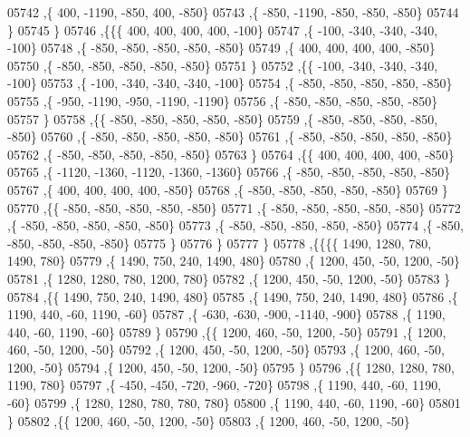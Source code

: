 \begin{DoxyCode}
05742     ,\{   400, -1190,  -850,   400,  -850\}
05743     ,\{  -850, -1190,  -850,  -850,  -850\}
05744     \}
05745    \}
05746   ,\{\{\{   400,   400,   400,   400,  -100\}
05747     ,\{  -100,  -340,  -340,  -340,  -100\}
05748     ,\{  -850,  -850,  -850,  -850,  -850\}
05749     ,\{   400,   400,   400,   400,  -850\}
05750     ,\{  -850,  -850,  -850,  -850,  -850\}
05751     \}
05752    ,\{\{  -100,  -340,  -340,  -340,  -100\}
05753     ,\{  -100,  -340,  -340,  -340,  -100\}
05754     ,\{  -850,  -850,  -850,  -850,  -850\}
05755     ,\{  -950, -1190,  -950, -1190, -1190\}
05756     ,\{  -850,  -850,  -850,  -850,  -850\}
05757     \}
05758    ,\{\{  -850,  -850,  -850,  -850,  -850\}
05759     ,\{  -850,  -850,  -850,  -850,  -850\}
05760     ,\{  -850,  -850,  -850,  -850,  -850\}
05761     ,\{  -850,  -850,  -850,  -850,  -850\}
05762     ,\{  -850,  -850,  -850,  -850,  -850\}
05763     \}
05764    ,\{\{   400,   400,   400,   400,  -850\}
05765     ,\{ -1120, -1360, -1120, -1360, -1360\}
05766     ,\{  -850,  -850,  -850,  -850,  -850\}
05767     ,\{   400,   400,   400,   400,  -850\}
05768     ,\{  -850,  -850,  -850,  -850,  -850\}
05769     \}
05770    ,\{\{  -850,  -850,  -850,  -850,  -850\}
05771     ,\{  -850,  -850,  -850,  -850,  -850\}
05772     ,\{  -850,  -850,  -850,  -850,  -850\}
05773     ,\{  -850,  -850,  -850,  -850,  -850\}
05774     ,\{  -850,  -850,  -850,  -850,  -850\}
05775     \}
05776    \}
05777   \}
05778  ,\{\{\{\{  1490,  1280,   780,  1490,   780\}
05779     ,\{  1490,   750,   240,  1490,   480\}
05780     ,\{  1200,   450,   -50,  1200,   -50\}
05781     ,\{  1280,  1280,   780,  1200,   780\}
05782     ,\{  1200,   450,   -50,  1200,   -50\}
05783     \}
05784    ,\{\{  1490,   750,   240,  1490,   480\}
05785     ,\{  1490,   750,   240,  1490,   480\}
05786     ,\{  1190,   440,   -60,  1190,   -60\}
05787     ,\{  -630,  -630,  -900, -1140,  -900\}
05788     ,\{  1190,   440,   -60,  1190,   -60\}
05789     \}
05790    ,\{\{  1200,   460,   -50,  1200,   -50\}
05791     ,\{  1200,   460,   -50,  1200,   -50\}
05792     ,\{  1200,   450,   -50,  1200,   -50\}
05793     ,\{  1200,   460,   -50,  1200,   -50\}
05794     ,\{  1200,   450,   -50,  1200,   -50\}
05795     \}
05796    ,\{\{  1280,  1280,   780,  1190,   780\}
05797     ,\{  -450,  -450,  -720,  -960,  -720\}
05798     ,\{  1190,   440,   -60,  1190,   -60\}
05799     ,\{  1280,  1280,   780,   780,   780\}
05800     ,\{  1190,   440,   -60,  1190,   -60\}
05801     \}
05802    ,\{\{  1200,   460,   -50,  1200,   -50\}
05803     ,\{  1200,   460,   -50,  1200,   -50\}

\end{DoxyCode}
